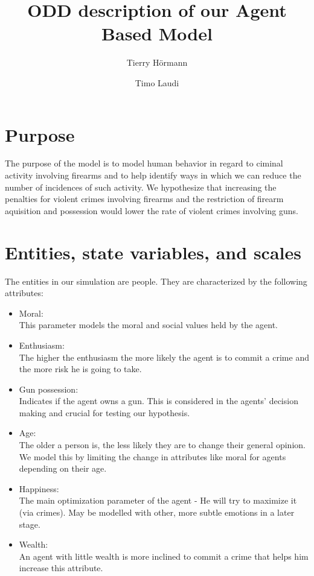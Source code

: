 \documentclass{article}
\title{ODD description of our Agent Based Model}
\author{Tierry H\"ormann \and Timo Laudi}
\begin{document}
	\maketitle

	\section{Purpose}
		The purpose of the model is to model human behavior in regard to ciminal activity involving
		firearms and to help identify ways in which we can reduce the number of incidences of such
		activity.
		We hypothesize that increasing the penalties for violent crimes involving firearms and the
		restriction of firearm aquisition and possession would lower the rate of violent crimes
		involving guns.

	\section{Entities, state variables, and scales} \label{entities}
		The entities in our simulation are people. They are characterized by the following attributes:

		\begin{itemize}
			\item Moral:\\
				This parameter models the moral and social values held by the agent.
			\item Enthusiasm:\\
				The higher the enthusiasm the more likely the agent is to commit a crime and the
				more risk he is going to take.
			\item Gun possession:\\
				Indicates if the agent owns a gun. This is considered in the agents' decision
				making and crucial for testing our hypothesis.
			\item Age:\\
				The older a person is, the less likely they are to change their general opinion.
				We model this by limiting the change in attributes like moral for agents depending
				on their age.
			\item Happiness:\\
				The main optimization parameter of the agent - He will try to maximize it (via
				crimes). May be modelled  with other, more subtle emotions in a later stage.
			\item Wealth:\\
				An agent with little wealth is more inclined to commit a crime that helps him
				increase this attribute.
		\end{itemize}
\end{document}
